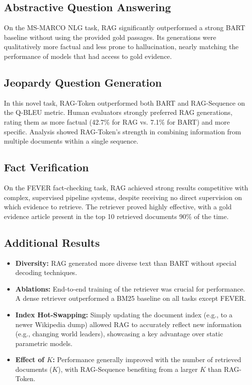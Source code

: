 \documentclass[a4paper,12pt]{article}
\begin{document}
\subsection{Abstractive Question Answering}
On the MS-MARCO NLG task, RAG significantly outperformed a strong BART baseline without using the provided gold passages. Its generations were qualitatively more factual and less prone to hallucination, nearly matching the performance of models that had access to gold evidence.

\subsection{Jeopardy Question Generation}
In this novel task, RAG-Token outperformed both BART and RAG-Sequence on the Q-BLEU metric. Human evaluators strongly preferred RAG generations, rating them as more factual (42.7\% for RAG vs. 7.1\% for BART) and more specific. Analysis showed RAG-Token's strength in combining information from multiple documents within a single sequence.

\subsection{Fact Verification}
On the FEVER fact-checking task, RAG achieved strong results competitive with complex, supervised pipeline systems, despite receiving no direct supervision on which evidence to retrieve. The retriever proved highly effective, with a gold evidence article present in the top 10 retrieved documents 90\% of the time.

\subsection{Additional Results}
\begin{itemize}
    \item \textbf{Diversity:} RAG generated more diverse text than BART without special decoding techniques.
    \item \textbf{Ablations:} End-to-end training of the retriever was crucial for performance. A dense retriever outperformed a BM25 baseline on all tasks except FEVER.
    \item \textbf{Index Hot-Swapping:} Simply updating the document index (e.g., to a newer Wikipedia dump) allowed RAG to accurately reflect new information (e.g., changing world leaders), showcasing a key advantage over static parametric models.
    \item \textbf{Effect of $K$:} Performance generally improved with the number of retrieved documents ($K$), with RAG-Sequence benefiting from a larger $K$ than RAG-Token.
\end{itemize}
\end{document}
